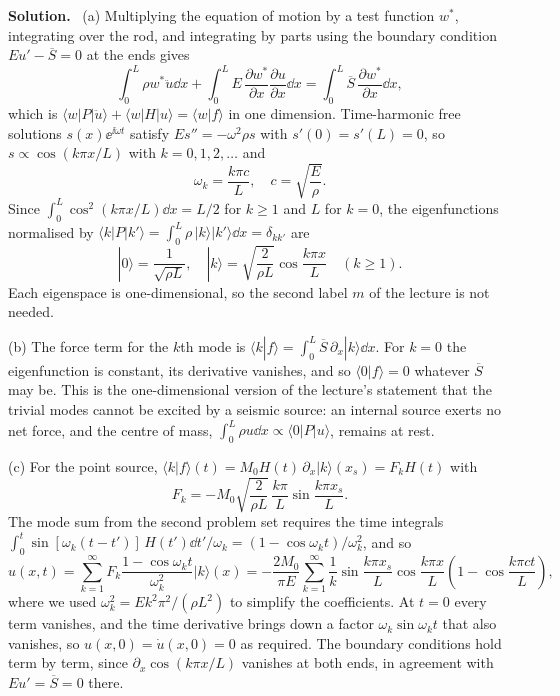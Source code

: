 \documentclass[a4paper,12pt]{paper}
\newenvironment{solution}{\par\noindent\textbf{Solution.}\ }{\par\medskip}
\begin{document}
\begin{solution}
(a) Multiplying the equation of motion by a test function $w^{*}$, integrating over the rod, and
integrating by parts using the boundary condition $Eu'-\overline{S}=0$ at the ends gives
\begin{equation}
\int_{0}^{L}\rho w^{*}\ddot{u}\dd x+\int_{0}^{L}E\,\frac{\partial w^{*}}{\partial x}\frac{\partial u}{\partial x}\dd x
=\int_{0}^{L}\overline{S}\,\frac{\partial w^{*}}{\partial x}\dd x,
\label{eq:9}
\end{equation}
which is $\langle w|P|\ddot{u}\rangle+\langle w|H|u\rangle=\langle w|f\rangle$ in one dimension.
Time-harmonic free solutions $s(x)\ee^{\ii\omega t}$ satisfy $Es''=-\omega^{2}\rho s$ with
$s'(0)=s'(L)=0$, so $s\propto\cos(k\pi x/L)$ with $k=0,1,2,\dots$ and
\begin{equation}
\omega_{k}=\frac{k\pi c}{L},\quad c=\sqrt{\frac{E}{\rho}}.
\label{eq:10}
\end{equation}
Since $\int_{0}^{L}\cos^{2}(k\pi x/L)\dd x=L/2$ for $k\ge 1$ and $L$ for $k=0$, the
eigenfunctions normalised by $\langle k|P|k'\rangle=\int_{0}^{L}\rho\,|k\rangle|k'\rangle\dd x=\delta_{kk'}$ are
\begin{equation}
|0\rangle=\frac{1}{\sqrt{\rho L}},\quad
|k\rangle=\sqrt{\frac{2}{\rho L}}\cos\frac{k\pi x}{L}\quad(k\ge 1).
\label{eq:11}
\end{equation}
Each eigenspace is one-dimensional, so the second label $m$ of the lecture is not needed.

(b) The force term for the $k$th mode is $\langle k|f\rangle=\int_{0}^{L}\overline{S}\,\partial_{x}|k\rangle\dd x$.
For $k=0$ the eigenfunction is constant, its derivative vanishes, and so $\langle 0|f\rangle=0$
whatever $\overline{S}$ may be. This is the one-dimensional version of the lecture's statement that
the trivial modes cannot be excited by a seismic source: an internal source exerts no net force,
and the centre of mass, $\int_{0}^{L}\rho u\dd x\propto\langle 0|P|u\rangle$, remains at rest.

(c) For the point source, $\langle k|f\rangle(t)=M_{0}H(t)\,\partial_{x}|k\rangle(x_{s})=F_{k}H(t)$ with
\begin{equation}
F_{k}=-M_{0}\sqrt{\frac{2}{\rho L}}\,\frac{k\pi}{L}\sin\frac{k\pi x_{s}}{L}.
\label{eq:12}
\end{equation}
The mode sum from the second problem set requires the time integrals
$\int_{0}^{t}\sin[\omega_{k}(t-t')]\,H(t')\dd t'/\omega_{k}=(1-\cos\omega_{k}t)/\omega_{k}^{2}$, and so
\begin{equation}
u(x,t)=\sum_{k=1}^{\infty}F_{k}\frac{1-\cos\omega_{k}t}{\omega_{k}^{2}}|k\rangle(x)
=-\frac{2M_{0}}{\pi E}\sum_{k=1}^{\infty}\frac{1}{k}\sin\frac{k\pi x_{s}}{L}\cos\frac{k\pi x}{L}
\left(1-\cos\frac{k\pi ct}{L}\right),
\label{eq:13}
\end{equation}
where we used $\omega_{k}^{2}=Ek^{2}\pi^{2}/(\rho L^{2})$ to simplify the coefficients. At $t=0$
every term vanishes, and the time derivative brings down a factor $\omega_{k}\sin\omega_{k}t$ that
also vanishes, so $u(x,0)=\dot{u}(x,0)=0$ as required. The boundary conditions hold term by term,
since $\partial_{x}\cos(k\pi x/L)$ vanishes at both ends, in agreement with $Eu'=\overline{S}=0$ there.


\end{solution}
\end{document}
